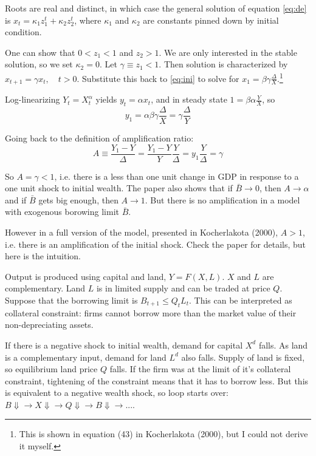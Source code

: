 \documentclass{article}
\begin{document}
Roots are real and distinct, in which case the general solution of
equation \eqref{eq:de} is $x_t=\kappa_1 z_1^t+\kappa_2z_2^t$, where
$\kappa_1$ and $\kappa_2$ are constants pinned down by initial
condition.

One can show that $0<z_1<1$ and $z_2>1$. We are only interested in the
stable solution, so we set $\kappa_2=0$. Let $\gamma\equiv
z_1<1$. Then solution is characterized by
$x_{t+1}=\gamma x_t,\quad t>0$. Substitute this back to \eqref{eq:ini}
to solve for $x_1=\beta\gamma\frac{\Delta}{X}$.\footnote{This is shown
  in equation (43) in Kocherlakota (2000), but I could not derive it
  myself.}

Log-linearizing $Y_t=X_t^\alpha$ yields $y_t=\alpha x_t$, and in
steady state $1=\beta\alpha\frac{Y}{X}$, so
\begin{equation*}
  y_1=\alpha\beta\gamma\frac{\Delta}{X}=\gamma\frac{\Delta}{Y}
\end{equation*}

Going back to the definition of amplification ratio:
\begin{equation*}
  A\equiv\frac{Y_1-Y}{\Delta}=\frac{Y_1-Y}{Y}\frac{Y}{\Delta}=y_1\frac{Y}{\Delta}=\gamma
\end{equation*}

So $A=\gamma<1$, i.e. there is a less than one unit change in GDP in
response to a one unit shock to initial wealth. The paper also shows
that if $\bar{B}\to 0$, then $A\to\alpha$ and if $\bar{B}$ gets big
enough, then $A\to 1$. But there is no amplification in a model with
exogenous borowing limit $\bar{B}$.

However in a full version of the model, presented in Kocherlakota
(2000), $A>1$, i.e. there is an amplification of the initial
shock. Check the paper for details, but here is the intuition.

Output is produced using capital and land, $Y=F(X,L)$. $X$ and $L$ are
complementary. Land $L$ is in limited supply and can be traded at
price $Q$. Suppose that the borrowing limit is
$B_{t+1}\le Q_tL_t$. This can be interpreted as collateral constraint:
firms cannot borrow more than the market value of their
non-depreciating assets.

If there is a negative shock to initial wealth, demand for capital
$X^d$ falls. As land is a complementary input, demand for land $L^d$
also falls. Supply of land is fixed, so equilibrium land price $Q$
falls. If the firm was at the limit of it's collateral constraint,
tightening of the constraint means that it has to borrow less. But
this is equivalent to a negative wealth shock, so loop starts over:
$B\Downarrow\to X\Downarrow\to Q\Downarrow\to B\Downarrow\to ...$.
\end{document}
